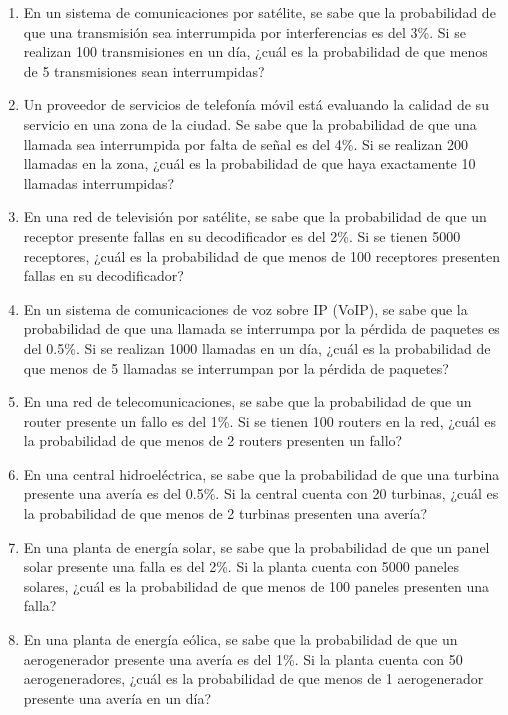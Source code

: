 \begin{Ejer}
\begin{enumerate}
    \item En un sistema de comunicaciones por satélite, se sabe que la probabilidad de que una transmisión sea interrumpida por interferencias es del 3\%. Si se realizan 100 transmisiones en un día, ¿cuál es la probabilidad de que menos de 5 transmisiones sean interrumpidas?

    \item Un proveedor de servicios de telefonía móvil está evaluando la calidad de su servicio en una zona de la ciudad. Se sabe que la probabilidad de que una llamada sea interrumpida por falta de señal es del 4\%. Si se realizan 200 llamadas en la zona, ¿cuál es la probabilidad de que haya exactamente 10 llamadas interrumpidas?

    \item En una red de televisión por satélite, se sabe que la probabilidad de que un receptor presente fallas en su decodificador es del 2\%. Si se tienen 5000 receptores, ¿cuál es la probabilidad de que menos de 100 receptores presenten fallas en su decodificador?

    \item En un sistema de comunicaciones de voz sobre IP (VoIP), se sabe que la probabilidad de que una llamada se interrumpa por la pérdida de paquetes es del 0.5\%. Si se realizan 1000 llamadas en un día, ¿cuál es la probabilidad de que menos de 5 llamadas se interrumpan por la pérdida de paquetes?

    \item En una red de telecomunicaciones, se sabe que la probabilidad de que un router presente un fallo es del 1\%. Si se tienen 100 routers en la red, ¿cuál es la probabilidad de que menos de 2 routers presenten un fallo?

    \item En una central hidroeléctrica, se sabe que la probabilidad de que una turbina presente una avería es del 0.5\%. Si la central cuenta con 20 turbinas, ¿cuál es la probabilidad de que menos de 2 turbinas presenten una avería?

    \item En una planta de energía solar, se sabe que la probabilidad de que un panel solar presente una falla es del 2\%. Si la planta cuenta con 5000 paneles solares, ¿cuál es la probabilidad de que menos de 100 paneles presenten una falla?

    \item En una planta de energía eólica, se sabe que la probabilidad de que un aerogenerador presente una avería es del 1\%. Si la planta cuenta con 50 aerogeneradores, ¿cuál es la probabilidad de que menos de 1 aerogenerador presente una avería en un día?


\end{enumerate}
\end{Ejer} 


